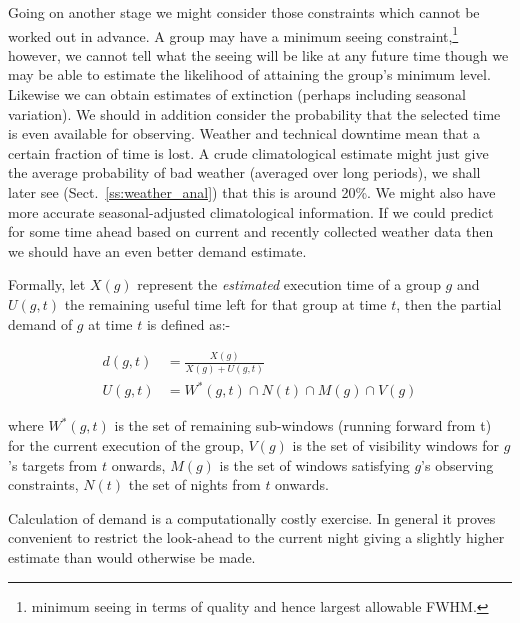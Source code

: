Going on another stage we might consider those constraints which cannot be worked out in advance. A group may have a minimum seeing constraint,\footnote[2]{minimum seeing in terms of quality and hence largest allowable FWHM.} however, we cannot tell what the seeing will be like at any future time though we may be able to estimate the likelihood of attaining the group's minimum level. Likewise we can obtain estimates of extinction (perhaps including seasonal variation). We should in addition consider the probability that the selected time is even available for observing. Weather and technical downtime mean that a certain fraction of time is lost. A crude climatological estimate might just give the average probability of bad weather (averaged over long periods), we shall later see (Sect.~\ref{ss:weather_anal}) that this is around 20\%. We might also have more accurate seasonal-adjusted climatological information. If we could predict for some time ahead based on current and recently collected weather data then we should have an even better demand estimate. 

Formally, let $X(g)$ represent the \emph{estimated} execution time of a group $g$ and $U(g,t)$ the remaining useful time left for that group at time $t$, then the partial demand of $g$ at time $t$ is defined as:-


\begin{align}
\label{eq:demand}
  d(g,t) &= \frac{X(g)}{X(g) + U(g,t)} \\
  U(g,t) &= W^*(g,t) \cap N(t) \cap M(g) \cap V(g)
\end{align}


where $W^*(g,t)$ is the set of remaining sub-windows (running forward from t) for the current execution of the group, $V(g)$ is the set of visibility windows for $g$'s targets from $t$ onwards, $M(g)$ is the set of windows satisfying $g$'s observing constraints, $N(t)$ the set of nights from $t$ onwards.

Calculation of demand is a computationally costly exercise. In general it proves convenient to restrict the look-ahead to the current night giving a slightly higher estimate than would otherwise be made.

